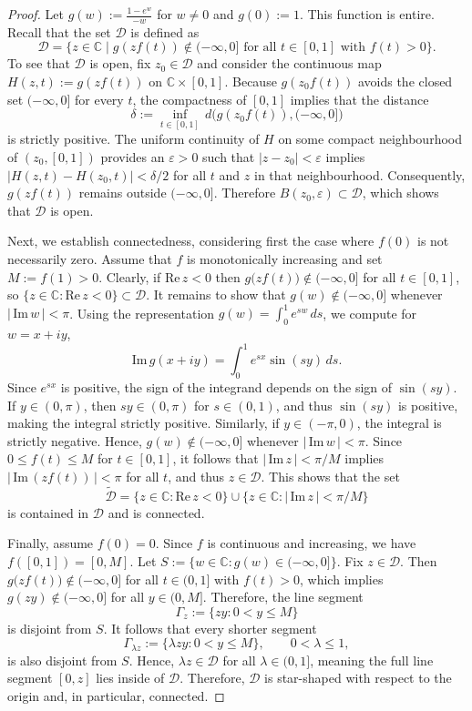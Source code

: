 \documentclass[10pt,a4paper]{amsart}
\newcommand{\C}{\mathbb{C}}
\renewcommand{\Im}{\mathrm{Im}\,}
\renewcommand{\Re}{\mathrm{Re}\,}
\begin{document}
\begin{proof}
Let $g(w) := \frac{1-e^{w}}{-w}$ for $w \ne 0$ and $g(0) := 1$. This function is entire. Recall that the set $\mathscr{D}$ is defined as
\[
\mathscr{D} = \{z \in \mathbb{C} \mid g(zf(t)) \notin (-\infty, 0] \text{ for all } t \in [0, 1] \text{ with } f(t)>0\}.
\]
To see that $\mathscr{D}$ is open, fix $z_0\in \mathscr{D}$ and consider the continuous map $H(z,t):=g(zf(t))$ on $\C\times[0,1]$. Because $g(z_0f(t))$ avoids the closed set $(-\infty,0]$ for every $t$, the compactness of $[0,1]$ implies that the distance
\[
\delta:=\inf_{t\in[0,1]}\,d\bigl(g(z_0f(t)),(-\infty,0]\bigr)
\]
is strictly positive. The uniform continuity of $H$ on some compact neighbourhood of $(z_0,[0,1])$ provides an $\varepsilon>0$ such that $|z-z_0|<\varepsilon$ implies $|H(z,t)-H(z_0,t)|<\delta/2$ for all $t$ and $z$ in that neighbourhood. Consequently, $g(zf(t))$ remains outside $(-\infty,0]$. Therefore $B(z_0,\varepsilon)\subset \mathscr{D}$, which shows that $\mathscr{D}$ is open.

Next, we establish connectedness, considering first the case where $f(0)$ is not necessarily zero. Assume that $f$ is monotonically increasing and set $M:=f(1)>0$. Clearly, if $\Re z<0$ then $g\bigl(zf(t)\bigr)\notin(-\infty,0]$ for all $t\in[0,1]$, so $\{z\in\C:\Re z<0\}\subset \mathscr{D}$. It remains to show that $g(w)\notin(-\infty,0]$ whenever $|\,\Im w\,|<\pi$. Using the representation $g(w)=\int_{0}^{1}e^{sw}\,ds$, we compute for $w=x+iy$,
\[
\Im g(x+iy)=\int_{0}^{1}e^{sx}\sin(sy)\,ds.
\]
Since $e^{sx}$ is positive, the sign of the integrand depends on the sign of $\sin(sy)$. If $y\in (0,\pi)$, then $sy\in (0, \pi)$ for $s\in(0,1)$, and thus $\sin(sy)$ is positive, making the integral strictly positive. Similarly, if $y\in (-\pi, 0)$, the integral is strictly negative. Hence, $g(w)\notin(-\infty,0]$ whenever $|\,\Im w\,|<\pi$. Since $0\le f(t)\le M$ for $t\in[0,1]$, it follows that $|\,\Im z\,|<\pi/M$ implies $|\,\Im(zf(t))\,|<\pi$ for all $t$, and thus $z\in\mathscr{D}$. This shows that the set
\[
\widetilde{\mathscr{D}}=\{z\in\C:\Re z<0\}\cup\{z\in\C:|\,\Im z\,|<\pi/M\}
\]
is contained in $\mathscr{D}$ and is connected.

Finally, assume $f(0) = 0$. Since $f$ is continuous and increasing, we have $f([0,1])=[0,M]$. Let $S:=\{w\in\C: g(w)\in(-\infty,0]\}$. Fix $z\in \mathscr{D}$. Then $g\bigl(zf(t)\bigr)\notin(-\infty,0]$ for all $t\in(0,1]$ with $f(t)>0$, which implies $g(zy)\notin(-\infty,0]$ for all $y\in(0,M]$. Therefore, the line segment
\[
\Gamma_z:=\{zy:0<y\le M\}
\]
is disjoint from $S$. It follows that every shorter segment
\[
\Gamma_{\lambda z}:=\{\lambda zy:0<y\le M\},\qquad 0<\lambda\le 1,
\]
is also disjoint from $S$. Hence, $\lambda z\in \mathscr{D}$ for all $\lambda\in(0,1]$, meaning the full line segment $[0,z]$ lies inside of $\mathscr{D}$. Therefore, $\mathscr{D}$ is star-shaped with respect to the origin and, in particular, connected.
\end{proof}
\end{document}
